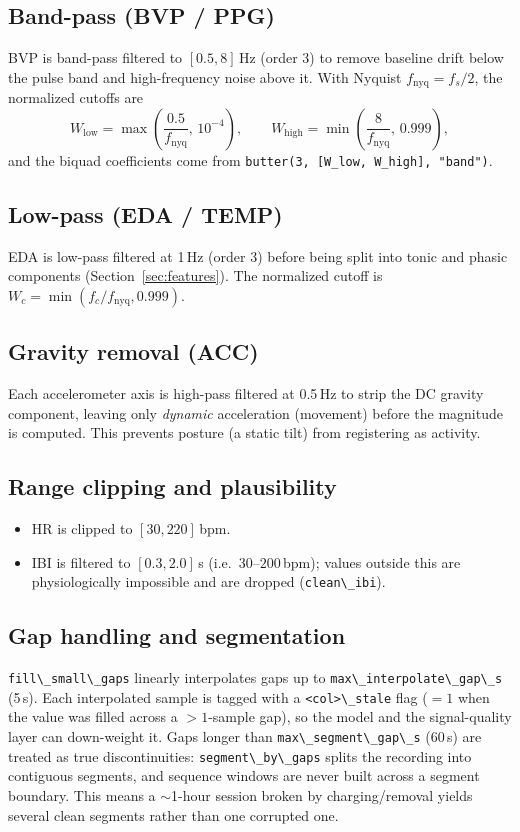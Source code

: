 \documentclass[11pt,a4paper]{article}
\newcommand{\code}[1]{\lstinline[basicstyle=\ttfamily\normalsize]!#1!}
\begin{document}
\subsection{Band-pass (BVP / PPG)}
BVP is band-pass filtered to $[0.5, 8]\,$Hz (order 3) to remove baseline drift
below the pulse band and high-frequency noise above it. With Nyquist
$f_{\text{nyq}} = f_s/2$, the normalized cutoffs are
\[
W_{\text{low}} = \max\!\left(\frac{0.5}{f_{\text{nyq}}},\,10^{-4}\right),\qquad
W_{\text{high}} = \min\!\left(\frac{8}{f_{\text{nyq}}},\,0.999\right),
\]
and the biquad coefficients come from \code{butter(3, [W_low, W_high], "band")}.

\subsection{Low-pass (EDA / TEMP)}
EDA is low-pass filtered at 1\,Hz (order 3) before being split into tonic and
phasic components (Section~\ref{sec:features}). The normalized cutoff is
$W_c = \min(f_c/f_{\text{nyq}}, 0.999)$.

\subsection{Gravity removal (ACC)}
Each accelerometer axis is high-pass filtered at 0.5\,Hz to strip the DC gravity
component, leaving only \emph{dynamic} acceleration (movement) before the
magnitude is computed. This prevents posture (a static tilt) from registering as
activity.

\subsection{Range clipping and plausibility}
\begin{itemize}[leftmargin=1.4em,itemsep=2pt]
\item HR is clipped to $[30, 220]$\,bpm.
\item IBI is filtered to $[0.3, 2.0]\,$s (i.e.\ $30$--$200$\,bpm); values outside
      this are physiologically impossible and are dropped
      (\code{clean\_ibi}).
\end{itemize}

\subsection{Gap handling and segmentation}
\code{fill\_small\_gaps} linearly interpolates gaps up to
\code{max\_interpolate\_gap\_s} (5\,s). Each interpolated sample is tagged with a
\code{<col>\_stale} flag ($=1$ when the value was filled across a $>1$-sample
gap), so the model and the signal-quality layer can down-weight it. Gaps longer
than \code{max\_segment\_gap\_s} (60\,s) are treated as true discontinuities:
\code{segment\_by\_gaps} splits the recording into contiguous segments, and
sequence windows are never built across a segment boundary. This means a
$\sim$1-hour session broken by charging/removal yields several clean segments
rather than one corrupted one.
\end{document}
